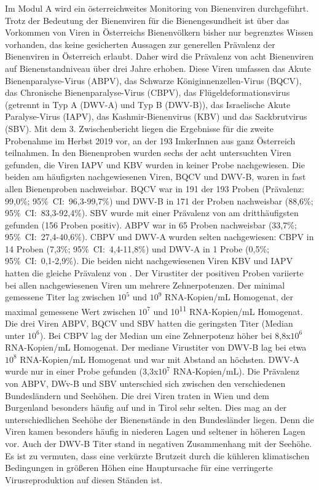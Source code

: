 Im Modul A wird ein österreichweites Monitoring von Bienenviren durchgeführt. Trotz der Bedeutung der Bienenviren für die Bienengesundheit ist über das Vorkommen von Viren in Österreichs Bienenvölkern bisher nur begrenztes Wissen vorhanden, das keine gesicherten Aussagen zur generellen Prävalenz der Bienenviren in Österreich erlaubt. Daher wird die Prävalenz von acht Bienenviren auf Bienenstandniveau über drei Jahre erhoben. Diese Viren umfassen das Akute Bienenparalyse-Virus (ABPV), das Schwarze Königinnenzellen-Virus (BQCV), das Chronische Bienenparalyse-Virus (CBPV), das Flügeldeformationsvirus (getrennt in Typ A (DWV-A) und Typ B (DWV-B)), das Israelische Akute Paralyse-Virus (IAPV), das Kashmir-Bienenvirus (KBV) und das Sackbrutvirus (SBV). 
\newline
Mit dem 3. Zwischenbericht liegen die Ergebnisse für die zweite Probenahme im Herbst 2019 vor, an der 193 ImkerInnen aus ganz Österreich teilnahmen. In den Bienenproben wurden sechs der acht untersuchten Viren gefunden, die Viren IAPV und KBV wurden in keiner Probe nachgewiesen. Die beiden am häufigsten nachgewiesenen Viren, BQCV und DWV-B, waren in fast allen Bienenproben nachweisbar. BQCV war in 191 der 193 Proben (Prävalenz: 99,0\%; 95\%~CI:~96,3-99,7\%) und DWV-B in 171 der Proben nachweisbar (88,6\%; 95\%~CI:~83,3-92,4\%). SBV wurde mit einer Prävalenz von   am dritthäufigsten gefunden (156 Proben positiv). ABPV war in 65 Proben nachweisbar (33,7\%; 95\%~CI:~27,4-40,6\%). CBPV und DWV-A wurden selten nachgewiesen: CBPV in 14 Proben (7,3\%; 95\%~CI:~4,4-11,8\%) und DWV-A in 1 Probe (0,5\%; 95\%~CI:~0,1-2,9\%). Die beiden nicht nachgewiesenen Viren KBV und IAPV hatten die gleiche Prävalenz von .
\newline
Der Virustiter der positiven Proben variierte bei allen nachgewiesenen Viren um mehrere Zehnerpotenzen. Der minimal gemessene Titer lag zwischen $10^5$ und $10^9$ RNA-Kopien/\si{\milli\liter} Homogenat, der maximal gemessene Wert zwischen $10^7$ und 10\textsuperscript{11} RNA-Kopien/\si{\milli\liter} Homogenat. Die drei Viren ABPV, BQCV und SBV hatten die geringsten Titer (Median unter $10^6$). Bei CBPV lag der Median um eine Zehnerpotenz höher bei 8,8x$10^6$ RNA-Kopien/\si{\milli\liter} Homogenat. Der mediane Virustiter von DWV-B lag bei etwa $10^8$ RNA-Kopien/\si{\milli\liter} Homogenat und war mit Abstand an höchsten. DWV-A wurde nur in einer Probe gefunden (3,3x$10^7$ RNA-Kopien/\si{\milli\liter}).
\newline
Die Prävalenz von ABPV, DWv-B und SBV unterschied sich zwischen den verschiedenen Bundesländern und Seehöhen. Die drei Viren traten in Wien und dem Burgenland besonders häufig auf und in Tirol sehr selten. Dies mag an der unterschiedlichen Seehöhe der Bienenstände in den Bundesländer liegen. Denn die Viren kamen besonders häufig in niederen Lagen und seltener in höheren Lagen vor. Auch der DWV-B Titer stand in negativen Zusammenhang mit der Seehöhe. Es ist zu vermuten, dass eine verkürzte Brutzeit durch die kühleren klimatischen Bedingungen in größeren Höhen eine Hauptursache für eine verringerte Virusreproduktion auf diesen Ständen ist.
